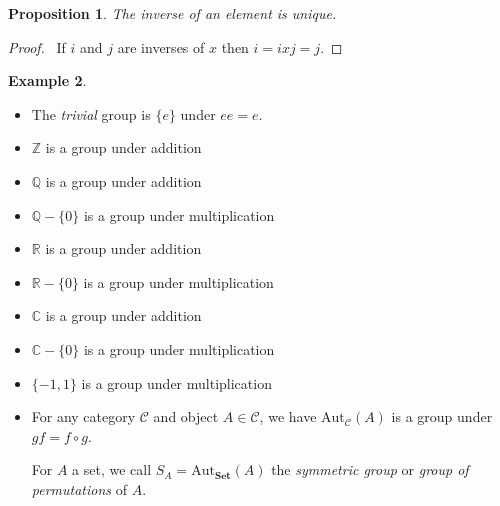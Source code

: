 \documentclass{book}
\let\qed\relax
\newtheorem{prop}{Proposition}[chapter]
\theoremstyle{definition}
\newtheorem{ex}[prop]{Example}
\newcommand{\Aut}[2]{\ensuremath{\mathrm{Aut}_{#1} \left( {#2} \right)}}
\newcommand{\Set}{\ensuremath{\mathbf{Set}}}
\begin{document}
\begin{prop}
    \label{prop:grp-inv-unique}
    The inverse of an element is unique.
\end{prop}

\begin{proof}
    \pf\ If $i$ and $j$ are inverses of $x$ then $i = ixj = j$. \qed
\end{proof}

\begin{ex}
    \begin{itemize}
        \item
              The \emph{trivial} group is $\{e\}$ under $ee = e$.
        \item $\mathbb{Z}$ is a group under addition %
        \item $\mathbb{Q}$ is a group under addition %
        \item $\mathbb{Q} - \{0\}$ is a group under multiplication
        \item $\mathbb{R}$ is a group under addition %
        \item $\mathbb{R} - \{0\}$ is a group under multiplication
        \item $\mathbb{C}$ is a group under addition %
        \item $\mathbb{C} - \{0\}$ is a group under multiplication
        \item $\{-1,1\}$ is a group under multiplication
        \item For any category $\mathcal{C}$ and object $A \in \mathcal{C}$, we have
              $\Aut{\mathcal{C}}{A}$ is a group under $gf = f \circ g$.

              For $A$ a set, we call $S_A = \Aut{\Set}{A}$ the \emph{symmetric group} or
              \emph{group of permutations} of $A$.


\end{itemize}
\end{ex}
\end{document}
